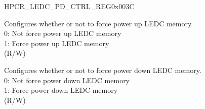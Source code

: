 \begin{register}{H}{PCR\_LEDC\_PD\_CTRL\_REG}{0x003C}\label{regdesc:PCRLEDCPDCTRLREG}
%
%
%
%
\regnewline%
\begin{regdesc}\begin{reglist}
\label{fielddesc:PCRLEDCMEMFORCEPU}\item [PCR\_LEDC\_MEM\_FORCE\_PU] Configures whether or not to force power up LEDC memory.\\
0: Not force power up LEDC memory\\
1: Force power up LEDC memory\\  (R/W)
\label{fielddesc:PCRLEDCMEMFORCEPD}\item [PCR\_LEDC\_MEM\_FORCE\_PD] Configures whether or not to force power down LEDC memory.\\
0: Not force power down LEDC memory\\
1: Force power down LEDC memory \\(R/W)
\end{reglist}\end{regdesc}
\end{register}


